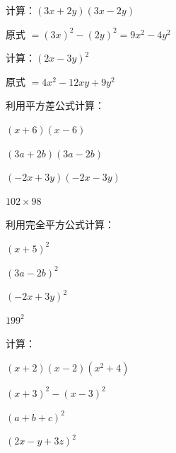 \documentclass[a4paper,12pt]{ctexart}
\begin{document}
\newpage




\begin{example}
计算：$(3x+2y)(3x-2y)$
\end{example}
\begin{solution}
原式 $=(3x)^2-(2y)^2=9x^2-4y^2$
\end{solution}



\begin{example}
计算：$(2x-3y)^2$
\end{example}
\begin{solution}
原式 $=4x^2-12xy+9y^2$
\end{solution}


\begin{exercise}
\item 利用平方差公式计算：
  \begin{subexercise}
    \item $(x+6)(x-6)$
    \item $(3a+2b)(3a-2b)$
    \item $(-2x+3y)(-2x-3y)$
    \item $102\times98$
  \end{subexercise}

\item 利用完全平方公式计算：
  \begin{subexercise}
    \item $(x+5)^2$
    \item $(3a-2b)^2$
    \item $(-2x+3y)^2$
    \item $199^2$
  \end{subexercise}

\item 计算：
  \begin{subexercise}
    \item $(x+2)(x-2)(x^2+4)$
    \item $(x+3)^2-(x-3)^2$
    \item $(a+b+c)^2$
    \item $(2x-y+3z)^2$
  \end{subexercise}
\end{exercise}
\end{document}

